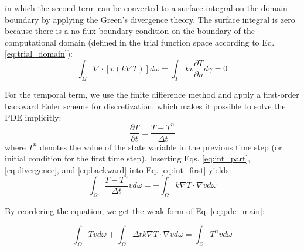 \documentclass[12pt,a4paper]{article}
\begin{document}
\noindent in which the second term can be converted to a surface integral on the domain boundary by applying the Green's divergence theory. The surface integral is zero because there is a no-flux boundary condition on the boundary of the computational domain (defined in the trial function space according to Eq. \ref{eq:trial_domain}):
\begin{equation} \label{eq:divergence}
\int_{\Omega} \nabla \cdot[v(k  \nabla T)] d \omega = \int_{\Gamma} k v \frac{\partial T}{\partial n} d \gamma=0
\end{equation}

\noindent For the temporal term, we use the finite difference method and apply a first-order backward Euler scheme for discretization, which makes it possible to solve the PDE implicitly:
\begin{equation} \label{eq:backward}
\frac{\partial T}{\partial t} = \frac{T-T^{n}}{\Delta t}
\end{equation}
\noindent where $T^n$ denotes the value of the state variable in the previous time step (or initial condition for the first time step). Inserting Eqs. \ref{eq:int_part}, \ref{eq:divergence}, and \ref{eq:backward} into Eq. \ref{eq:int_first} yields:
\begin{equation}
\int_{\Omega} \frac{T-T^{n}}{\Delta t} v d \omega=-\int_{\Omega} k  \nabla T \cdot \nabla v d \omega
\end{equation}

\noindent By reordering the equation, we get the weak form of Eq. \ref{eq:pde_main}:

\begin{equation}  \label{eq:weak_general}
\int_{\Omega} {T} v d \omega+\int_{\Omega} \Delta t k  \nabla T \cdot  \nabla v d \omega=\int_{\Omega} {T^{n}} v d \omega
\end{equation}
\end{document}
